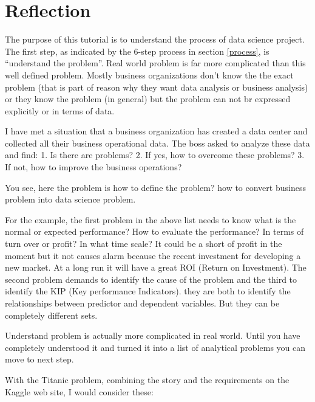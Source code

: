 \documentclass[
]{book}
\begin{document}
\hypertarget{reflection}{%
\section{Reflection}\label{reflection}}

The purpose of this tutorial is to understand the process of data science project. The first step, as indicated by the 6-step process in section \ref{process}, is ``understand the problem''. Real world problem is far more complicated than this well defined problem. Mostly business organizations don't know the the exact problem (that is part of reason why they want data analysis or business analysis) or they know the problem (in general) but the problem can not br expressed explicitly or in terms of data.

I have met a situation that a business organization has created a data center and collected all their business operational data. The boss asked to analyze these data and find:
1. Is there are problems?
2. If yes, how to overcome these problems?
3. If not, how to improve the business operations?

You see, here the problem is how to define the problem? how to convert business problem into data science problem.

For the example, the first problem in the above list needs to know what is the normal or expected performance? How to evaluate the performance? In terms of turn over or profit? In what time scale? It could be a short of profit in the moment but it not causes alarm because the recent investment for developing a new market. At a long run it will have a great ROI (Return on Investment). The second problem demands to identify the cause of the problem and the third to identify the KIP (Key performance Indicators). they are both to identify the relationships between predictor and dependent variables. But they can be completely different sets.

Understand problem is actually more complicated in real world. Until you have completely understood it and turned it into a list of analytical problems you can move to next step.

With the Titanic problem, combining the story and the requirements on the Kaggle web site, I would consider these:
\end{document}
